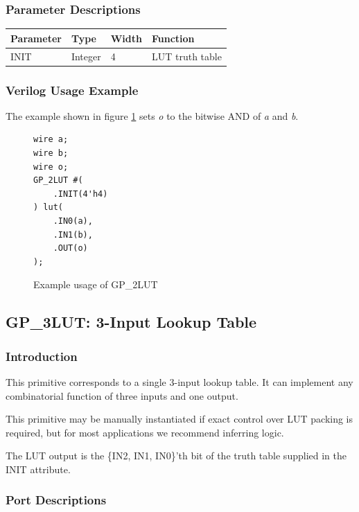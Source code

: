 \documentclass{article}
\begin{document}
\subsubsection{Parameter Descriptions}

\begin{tabularx}{4in}{|l|l|l|X|}
\hline
{\bfseries Parameter} & {\bfseries Type} & {\bfseries Width} & {\bfseries Function} \\
\hline
INIT & Integer & 4 & LUT truth table \\
\hline
\end{tabularx}

\subsubsection{Verilog Usage Example}

The example shown in figure \ref{gp-2LUT-example} sets \emph{o} to the bitwise AND of \emph{a} and \emph{b}.

\begin{figure}[h]
\begin{lstlisting}
wire a;
wire b;
wire o;
GP_2LUT #(
	.INIT(4'h4)
) lut(
	.IN0(a),
	.IN1(b),
	.OUT(o)
);
\end{lstlisting}
\caption{Example usage of GP\_2LUT}
\label{gp-2LUT-example}
\end{figure}


\pagebreak
\subsection{GP\_3LUT: 3-Input Lookup Table}

\subsubsection{Introduction}
This primitive corresponds to a single 3-input lookup table. It can implement any combinatorial function of three 
inputs and one output.

This primitive may be manually instantiated if exact control over LUT packing is required, but for most applications we 
recommend inferring logic.

The LUT output is the \{IN2, IN1, IN0\}'th bit of the truth table supplied in the INIT attribute.

\subsubsection{Port Descriptions}
\end{document}
